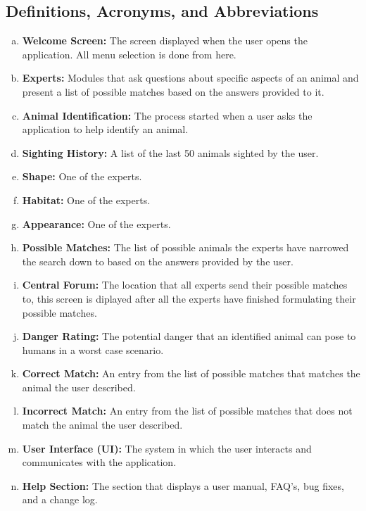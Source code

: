 \documentclass[]{article}
\begin{document}
\subsection{Definitions, Acronyms, and Abbreviations}
\label{sub:definitions_acronyms_and_abbreviations}
\begin{enumerate}[a)]
	\item\textbf{Welcome Screen:} The screen displayed when the user opens the application. All menu selection is done from here.
	\item\textbf{Experts:} Modules that ask questions about specific aspects of an animal and present a list of possible matches based on the answers provided to it.
	\item\textbf{Animal Identification:} The process started when a user asks the application to help identify an animal.
	\item\textbf{Sighting History:} A list of the last 50 animals sighted by the user.
	\item\textbf{Shape:} One of the experts.
	\item\textbf{Habitat:} One of the experts.
	\item\textbf{Appearance:} One of the experts.
	\item\textbf{Possible Matches:} The list of possible animals the experts have narrowed the search down to based on the answers provided by the user.
	\item\textbf{Central Forum:} The location that all experts send their possible matches to, this screen is diplayed after all the experts have finished formulating their possible matches.
	\item\textbf{Danger Rating:} The potential danger that an identified animal can pose to humans in a worst case scenario.
	\item\textbf{Correct Match:} An entry from the list of possible matches that matches the animal the user described.
	\item\textbf{Incorrect Match:} An entry from the list of possible matches that does not match the animal the user described.
	\item\textbf{User Interface (UI):} The system in which the user interacts and communicates with the application.
	\item\textbf{Help Section:} The section that displays a user manual, FAQ's, bug fixes, and a change log.
\end{enumerate}
\end{document}
